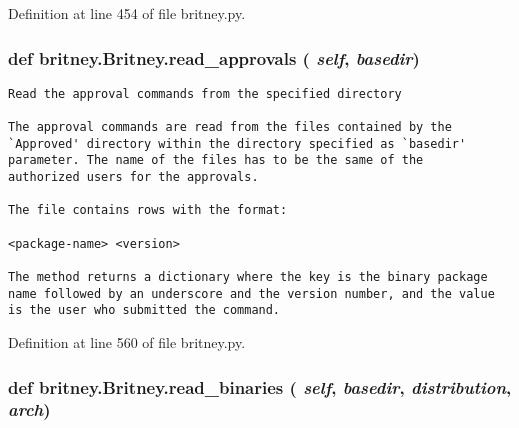 Definition at line 454 of file britney.py.
\subsubsection{\setlength{\rightskip}{0pt plus 5cm}def britney.Britney.read\_\-approvals ( {\em self},  {\em basedir})}\label{classbritney_1_1Britney_39248f0cfea1c8798b2ca5a97d37eaf8}




\footnotesize\begin{verbatim}Read the approval commands from the specified directory

The approval commands are read from the files contained by the 
`Approved' directory within the directory specified as `basedir'
parameter. The name of the files has to be the same of the
authorized users for the approvals.

The file contains rows with the format:

<package-name> <version>

The method returns a dictionary where the key is the binary package
name followed by an underscore and the version number, and the value
is the user who submitted the command.
\end{verbatim}
\normalsize
 

Definition at line 560 of file britney.py.
\subsubsection{\setlength{\rightskip}{0pt plus 5cm}def britney.Britney.read\_\-binaries ( {\em self},  {\em basedir},  {\em distribution},  {\em arch})}\label{classbritney_1_1Britney_1b2b0f42e4af1cee472f93e955b30421}




